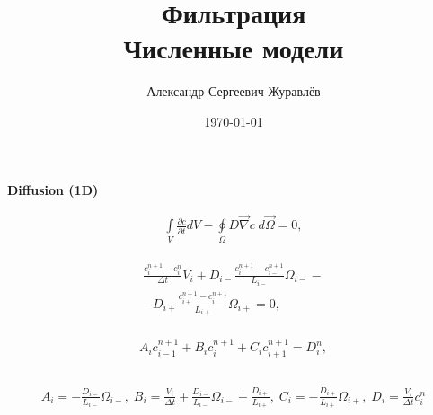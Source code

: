 \documentclass[a4paper,12pt,russian]{extreport}
\author{Александр Сергеевич Журавлёв}
\title{Фильтрация\\Численные модели}
\date{\today}
\begin{document}
\pagecolor{pageColor}
\color{fontColor}
\Russian
\printnomenclature[5em]

\begin{center}
{\large \textbf{Diffusion (1D)}}
\end{center}

\begin{eqnarray}
\label{eq:phys_D}
\int \limits_{V} \frac{\partial c}{\partial t} d V - \oint \limits_{\Omega} D \vec{\nabla}c \; d\vec{\Omega} = 0,
\end{eqnarray}

\begin{eqnarray}
\label{eq:num_D}
\begin{gathered}
\frac{c^{n+1}_{i} - c^{n}_{i}}{\Delta t} V_{i} +D_{i-}\frac{c^{n+1}_{i} - c^{n+1}_{i-}}{L_{i-}} \Omega_{i-} - \\
- D_{i+}\frac{c^{n+1}_{i+} - c^{n+1}_{i}}{L_{i+}} \Omega_{i+} = 0,
\end{gathered}
\end{eqnarray}

\begin{eqnarray}
\begin{gathered}
\label{eq:B_coeff}
A_i c_{i-1}^{n+1} + B_i c_{i}^{n+1} + C_i c_{i+1}^{n+1} = D_{i}^n, \\
\end{gathered}
\end{eqnarray}

\begin{eqnarray}
\begin{gathered}
\label{eq:coeff}
A_i = - \frac{D_{i-}}{L_{i-}} \Omega_{i-}, \;
B_i = \frac{V_{i}}{\Delta t} + \frac{D_{i-}}{L_{i-}} \Omega_{i-} + \frac{D_{i+}}{L_{i+}}, \;
C_i = - \frac{D_{i+}}{L_{i+}} \Omega_{i+}, \; 
D_i = \frac{V_{i}}{\Delta t} c_{i}^n
\end{gathered}
\end{eqnarray}
\end{document}
